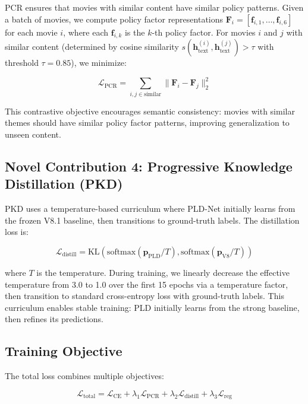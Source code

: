 \documentclass[11pt]{article}
\begin{document}
PCR ensures that movies with similar content have similar policy patterns. Given a batch of movies, we compute policy factor representations $\mathbf{F}_i = [\mathbf{f}_{i,1}, \ldots, \mathbf{f}_{i,6}]$ for each movie $i$, where each $\mathbf{f}_{i,k}$ is the $k$-th policy factor. For movies $i$ and $j$ with similar content (determined by cosine similarity $s(\mathbf{h}_{\text{text}}^{(i)}, \mathbf{h}_{\text{text}}^{(j)}) > \tau$ with threshold $\tau = 0.85$), we minimize:

\begin{equation}
\mathcal{L}_{\text{PCR}} = \sum_{i,j \in \text{similar}} \|\mathbf{F}_i - \mathbf{F}_j\|_2^2
\end{equation}

This contrastive objective encourages semantic consistency: movies with similar themes should have similar policy factor patterns, improving generalization to unseen content.

\subsection{Novel Contribution 4: Progressive Knowledge Distillation (PKD)}

PKD uses a temperature-based curriculum where PLD-Net initially learns from the frozen V8.1 baseline, then transitions to ground-truth labels. The distillation loss is:

\begin{equation}
\mathcal{L}_{\text{distill}} = \text{KL}(\text{softmax}(\mathbf{p}_{\text{PLD}} / T), \text{softmax}(\mathbf{p}_{\text{V8}} / T))
\end{equation}

where $T$ is the temperature. During training, we linearly decrease the effective temperature from 3.0 to 1.0 over the first 15 epochs via a temperature factor, then transition to standard cross-entropy loss with ground-truth labels. This curriculum enables stable training: PLD initially learns from the strong baseline, then refines its predictions.

\subsection{Training Objective}

The total loss combines multiple objectives:

\begin{equation}
\mathcal{L}_{\text{total}} = \mathcal{L}_{\text{CE}} + \lambda_1 \mathcal{L}_{\text{PCR}} + \lambda_2 \mathcal{L}_{\text{distill}} + \lambda_3 \mathcal{L}_{\text{reg}}
\end{equation}
\end{document}
